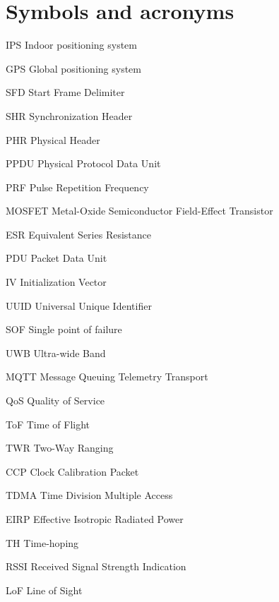 \documentclass[\main/main.tex]{subfiles}
\begin{document}
\chapter*{Symbols and acronyms}
\begin{abbrv}
    \item[IPS]  Indoor positioning system
    \item[GPS]  Global positioning system 
    \item[SFD]  Start Frame Delimiter
    \item[SHR]  Synchronization Header
    \item[PHR]  Physical Header
    \item[PPDU] Physical Protocol Data Unit
    \item[PRF]  Pulse Repetition Frequency
    \item[MOSFET]  Metal-Oxide Semiconductor Field-Effect Transistor
    \item[ESR]  Equivalent Series Resistance
    \item[PDU] Packet Data Unit
    \item[IV] Initialization Vector
    \item[UUID] Universal Unique Identifier 
    \item[SOF] Single point of failure 
    \item[UWB] Ultra-wide Band 
    \item[MQTT] Message Queuing Telemetry Transport 
    \item[QoS] Quality of Service
    \item[ToF] Time of Flight
    \item[TWR] Two-Way Ranging
    \item[CCP] Clock Calibration Packet  
    \item[TDMA] Time Division Multiple Access 
    \item[EIRP] Effective Isotropic Radiated Power
    \item[TH] Time-hoping 
    \item[RSSI] Received Signal Strength Indication
    \item[LoF] Line of Sight
\end{abbrv}
\end{document}
